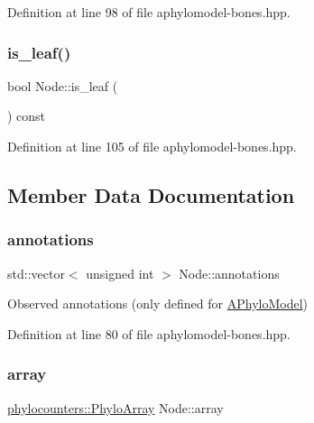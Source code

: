 Definition at line 98 of file aphylomodel-\/bones.\+hpp.

\mbox{\label{class_node_af7cc2d0f435e3bee4388a0e9ab42adb8}} 
\subsubsection{\texorpdfstring{is\+\_\+leaf()}{is\_leaf()}}
{\footnotesize\ttfamily bool Node\+::is\+\_\+leaf (\begin{DoxyParamCaption}{ }\end{DoxyParamCaption}) const\hspace{0.3cm}{\ttfamily [inline]}}



Definition at line 105 of file aphylomodel-\/bones.\+hpp.



\subsection{Member Data Documentation}
\mbox{\label{class_node_aea43a76094980788d1debd3e18ed8070}} 
\subsubsection{\texorpdfstring{annotations}{annotations}}
{\footnotesize\ttfamily std\+::vector$<$ unsigned int $>$ Node\+::annotations}



Observed annotations (only defined for \hyperlink{class_a_phylo_model}{A\+Phylo\+Model}) 



Definition at line 80 of file aphylomodel-\/bones.\+hpp.

\mbox{\label{class_node_a86d6575dd1ad7ab0cb02c6e6202b0608}} 
\subsubsection{\texorpdfstring{array}{array}}
{\footnotesize\ttfamily \hyperlink{namespacebarry_1_1counters_1_1phylo_abd293bf65e494e903639fb5fb2c91604}{phylocounters\+::\+Phylo\+Array} Node\+::array}



